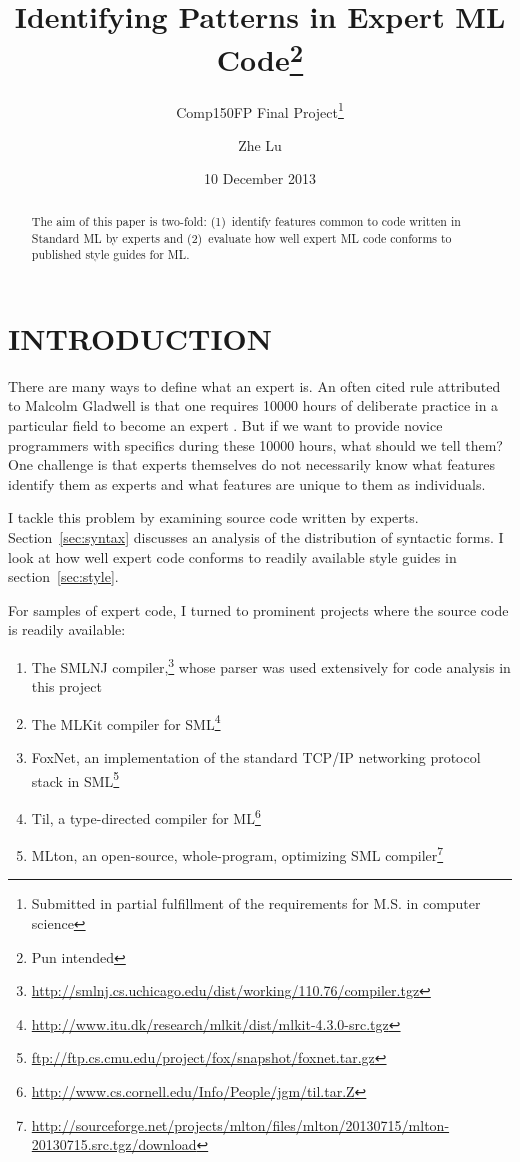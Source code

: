 \documentclass[12pt,abstracton]{scrartcl}
\title{Identifying Patterns in Expert ML Code\footnote{Pun intended}}
\subtitle{Comp150FP Final Project\footnote{Submitted in partial fulfillment of the requirements for M.S. in computer science}}
\author{Zhe Lu}
\date{10 December 2013}
\begin{document}


\maketitle
\begin{abstract}
The aim of this paper is two-fold: (1)~identify features common to code written in Standard ML by experts and
(2)~evaluate how well expert ML code conforms to published style guides for ML.
\end{abstract}
\section{INTRODUCTION}
There are many ways to define what an expert is.
An often cited rule attributed to Malcolm Gladwell is that one requires 10000 hours of deliberate practice
in a particular field to become an expert \cite{Gla08}. But if we want to provide novice programmers
with specifics during these 10000 hours, what should we tell them? One challenge is that experts themselves
do not necessarily know what features identify them as experts and what features are unique to them as individuals.

I tackle this problem by examining source code written by experts. Section~\ref{sec:syntax} discusses an analysis
of the distribution of syntactic forms. I look at how well expert code conforms to readily available
style guides in section~\ref{sec:style}.

For samples of expert code, I turned to prominent projects where the source code is readily available:
\begin{enumerate}
\item The SMLNJ compiler,\footnote{\url{http://smlnj.cs.uchicago.edu/dist/working/110.76/compiler.tgz}} whose parser was used extensively for code analysis in this project
\item The MLKit compiler for SML\footnote{\url{http://www.itu.dk/research/mlkit/dist/mlkit-4.3.0-src.tgz}}
\item FoxNet, an implementation of the standard TCP/IP networking protocol stack in SML\footnote{\url{ftp://ftp.cs.cmu.edu/project/fox/snapshot/foxnet.tar.gz}}
\item Til, a type-directed compiler for ML\footnote{\url{http://www.cs.cornell.edu/Info/People/jgm/til.tar.Z}}
\item MLton, an open-source, whole-program, optimizing SML compiler\footnote{\url{http://sourceforge.net/projects/mlton/files/mlton/20130715/mlton-20130715.src.tgz/download}}
\end{enumerate}
\end{document}

